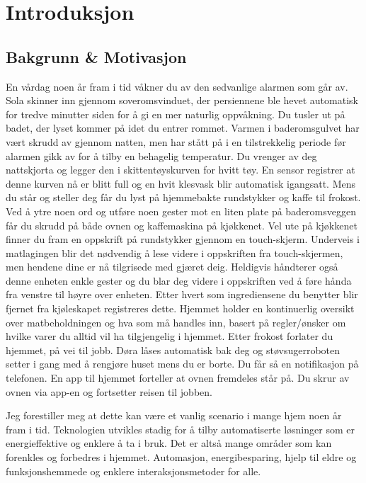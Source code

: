 \section[Introduksjon]{Introduksjon}
\subsection*{Bakgrunn \& Motivasjon}
En vårdag noen år fram i tid våkner du av den sedvanlige alarmen som går av. Sola skinner inn gjennom soveromsvinduet, der persiennene ble hevet automatisk for tredve minutter siden for å gi en mer naturlig oppvåkning. Du tusler ut på badet, der lyset kommer på idet du entrer rommet. Varmen i baderomsgulvet har vært skrudd av gjennom natten, men har stått på i en tilstrekkelig periode før alarmen gikk av for å tilby en behagelig temperatur. Du vrenger av deg nattskjorta og legger den i skittentøyskurven for hvitt tøy. En sensor registrer at denne kurven nå er blitt full og en hvit klesvask blir automatisk igangsatt. Mens du står og steller deg får du lyst på hjemmebakte rundstykker og kaffe til frokost. Ved å ytre noen ord og utføre noen gester mot en liten plate på baderomsveggen får du skrudd på både ovnen og kaffemaskina på kjøkkenet. Vel ute på kjøkkenet finner du fram en oppskrift på rundstykker gjennom en touch-skjerm. Underveis i matlagingen blir det nødvendig å lese videre i oppskriften fra touch-skjermen, men hendene dine er nå tilgrisede med gjæret deig. Heldigvis håndterer også denne enheten enkle gester og du blar deg videre i oppskriften ved å føre hånda fra venstre til høyre over enheten. Etter hvert som ingrediensene du benytter blir fjernet fra kjøleskapet registreres dette. Hjemmet holder en kontinuerlig oversikt over matbeholdningen og hva som må handles inn, basert på regler/ønsker om hvilke varer du alltid vil ha tilgjengelig i hjemmet. Etter frokost forlater du hjemmet, på vei til jobb. Døra låses automatisk bak deg og støvsugerroboten setter i gang med å rengjøre huset mens du er borte. Du får så en notifikasjon på telefonen. En app til hjemmet forteller at ovnen fremdeles står på. Du skrur av ovnen via app-en og fortsetter reisen til jobben.

Jeg forestiller meg at dette kan være et vanlig scenario i mange hjem noen år fram i tid. Teknologien utvikles stadig for å tilby automatiserte løsninger som er energieffektive og enklere å ta i bruk. Det er altså mange områder som kan forenkles og forbedres i hjemmet. Automasjon, energibesparing, hjelp til eldre og funksjonshemmede og enklere interaksjonsmetoder for alle.

